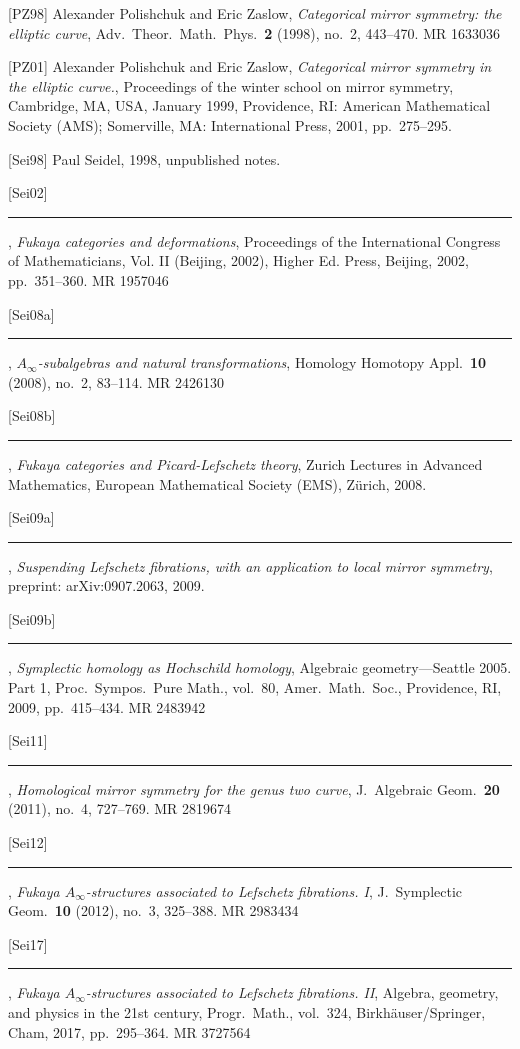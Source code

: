 [PZ98] Alexander Polishchuk and Eric Zaslow, \emph{Categorical mirror symmetry: the
elliptic curve}, Adv.\ Theor.\ Math.\ Phys.\ \textbf{2} (1998), no.~2, 443--470.
MR 1633036

[PZ01] Alexander Polishchuk and Eric Zaslow, \emph{Categorical mirror symmetry in the
elliptic curve.}, Proceedings of the winter school on mirror symmetry, Cambridge, MA,
USA, January 1999, Providence, RI: American Mathematical Society (AMS); Somerville,
MA: International Press, 2001, pp.~275--295.

[Sei98] Paul Seidel, 1998, unpublished notes.

[Sei02] \rule[0.4ex]{2.6em}{0.4pt} , \emph{Fukaya categories and deformations},
Proceedings of the International Congress of Mathematicians, Vol. II (Beijing, 2002),
Higher Ed. Press, Beijing, 2002, pp.~351--360. MR 1957046


[Sei08a] \rule[0.4ex]{2.6em}{0.4pt} , \emph{$A_\infty$-subalgebras and natural
transformations}, Homology Homotopy Appl.\ \textbf{10} (2008), no.~2, 83--114.
MR 2426130

[Sei08b] \rule[0.4ex]{2.6em}{0.4pt} , \emph{Fukaya categories and Picard-Lefschetz
theory}, Zurich Lectures in Advanced Mathematics, European Mathematical Society (EMS),
Z{\"u}rich, 2008.

[Sei09a] \rule[0.4ex]{2.6em}{0.4pt} , \emph{Suspending Lefschetz fibrations, with an
application to local mirror symmetry}, preprint: arXiv:0907.2063, 2009.

[Sei09b] \rule[0.4ex]{2.6em}{0.4pt} , \emph{Symplectic homology as Hochschild homology},
Algebraic geometry---Seattle 2005. Part 1, Proc.\ Sympos.\ Pure Math., vol.~80, Amer.\
Math.\ Soc., Providence, RI, 2009, pp.~415--434. MR 2483942

[Sei11] \rule[0.4ex]{2.6em}{0.4pt} , \emph{Homological mirror symmetry for the genus two
curve}, J.\ Algebraic Geom.\ \textbf{20} (2011), no.~4, 727--769. MR 2819674

[Sei12] \rule[0.4ex]{2.6em}{0.4pt} , \emph{Fukaya $A_\infty$-structures associated to
Lefschetz fibrations. I}, J.\ Symplectic Geom.\ \textbf{10} (2012), no.~3, 325--388.
MR 2983434

[Sei17] \rule[0.4ex]{2.6em}{0.4pt} , \emph{Fukaya $A_\infty$-structures associated to
Lefschetz fibrations. II}, Algebra, geometry, and physics in the 21st century, Progr.\
Math., vol.~324, Birkh{\"a}user/Springer, Cham, 2017, pp.~295--364. MR 3727564

